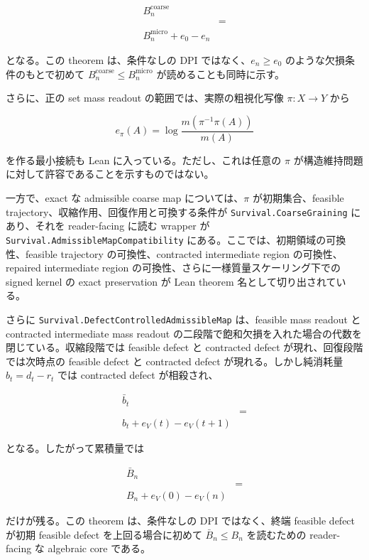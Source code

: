 \documentclass[12pt,a4paper]{article}
\begin{document}
\[
\begin{aligned}
B_{n}^{\mathrm{coarse}} \\
&= \\
B_{n}^{\mathrm{micro}}+e_0-e_{n}
\end{aligned}
\]

となる。この theorem は、条件なしの DPI ではなく、\(e_{n}\ge e_0\) のような欠損条件のもとで初めて \(B_{n}^{\mathrm{coarse}}\le B_{n}^{\mathrm{micro}}\) が読めることも同時に示す。

さらに、正の set mass readout の範囲では、実際の粗視化写像 \(\pi:X\to Y\) から

\[
e_\pi(A)=\log\frac{m(\pi^{-1}\pi(A))}{m(A)}
\]

を作る最小接続も Lean に入っている。ただし、これは任意の \(\pi\) が構造維持問題に対して許容であることを示すものではない。

一方で、exact な admissible coarse map については、\(\pi\) が初期集合、feasible trajectory、収縮作用、回復作用と可換する条件が \texttt{Survival.CoarseGraining} にあり、それを reader-facing に読む wrapper が \texttt{Survival.AdmissibleMapCompatibility} にある。ここでは、初期領域の可換性、feasible trajectory の可換性、contracted intermediate region の可換性、repaired intermediate region の可換性、さらに一様質量スケーリング下での signed kernel の exact preservation が Lean theorem 名として切り出されている。

さらに \texttt{Survival.DefectControlledAdmissibleMap} は、feasible mass readout と contracted intermediate mass readout の二段階で飽和欠損を入れた場合の代数を閉じている。収縮段階では feasible defect と contracted defect が現れ、回復段階では次時点の feasible defect と contracted defect が現れる。しかし純消耗量 \(b_{t}=d_{t}-r_{t}\) では contracted defect が相殺され、

\[
\begin{aligned}
\bar b_{t} \\
&= \\
b_{t} + e_{V}(t)-e_{V}(t+1)
\end{aligned}
\]

となる。したがって累積量では

\[
\begin{aligned}
\bar B_{n} \\
&= \\
B_{n} + e_{V}(0)-e_{V}(n)
\end{aligned}
\]

だけが残る。この theorem は、条件なしの DPI ではなく、終端 feasible defect が初期 feasible defect を上回る場合に初めて \(\bar B_{n}\le B_{n}\) を読むための reader-facing な algebraic core である。
\end{document}

